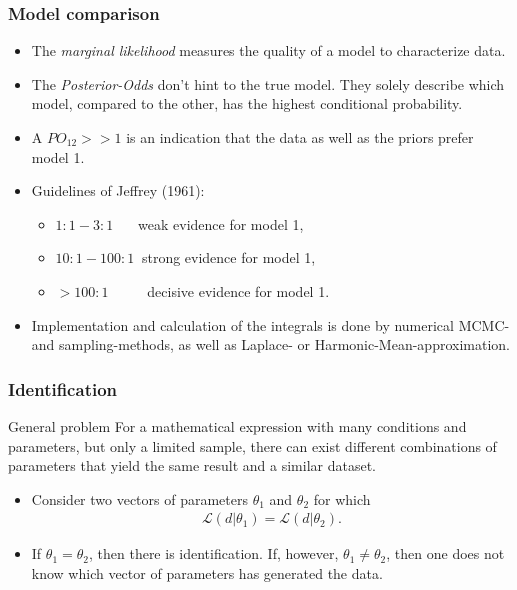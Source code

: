 \documentclass[handout]{beamer}  %
\begin{document}
\begin{frame}\frametitle{Model comparison}
  \begin{itemize}
    \item The \emph{marginal likelihood} measures the quality of a model to characterize data.
    \item The \emph{Posterior-Odds} don't hint to the true model. They solely describe which model, compared to the other, has the highest conditional probability.
    \item A $PO_{12}>>1$ is an indication that the data as well as the priors prefer model 1.
    \item Guidelines of Jeffrey (1961):
    \begin{itemize}
      \item $1:1 - 3:1\quad~~$ weak evidence for model 1,
      \item $10:1 - 100:1~$ strong evidence for model 1,
      \item $> 100:1\qquad~~$ decisive evidence for model 1.
    \end{itemize}
    \item Implementation and calculation of the integrals is done by numerical MCMC- and sampling-methods, as well as Laplace- or Harmonic-Mean-approximation.
  \end{itemize}
\end{frame}


\begin{frame}\frametitle{Identification}
  \begin{block}{General problem} For a mathematical expression with many conditions and parameters, but only a limited sample, there can exist different combinations of parameters that yield the same result and a similar dataset.\end{block}
  \begin{itemize}
    \item Consider two vectors of parameters ${\theta_1}$ and ${\theta_2}$ for which
    \begin{align*}
    \mathcal{L}({d}|{\theta_1}) = \mathcal{L}({d}|{\theta_2}).
    \end{align*}
    \item If ${\theta_1} = {\theta_2}$, then there is identification. If, however, ${\theta_1} \neq {\theta_2}$, then one does not know which vector of parameters has generated the data.
  \end{itemize}
\end{frame}
\end{document}
